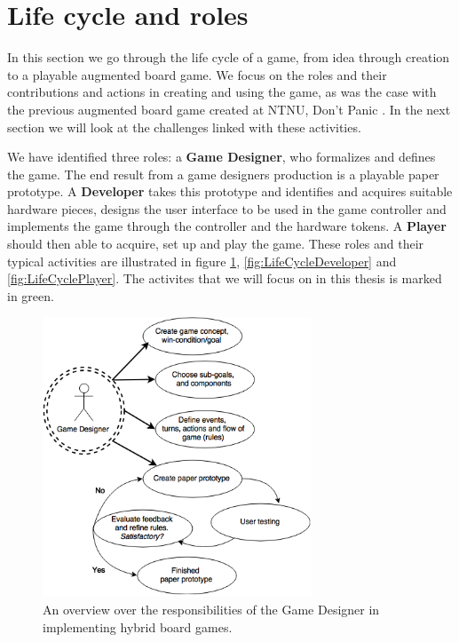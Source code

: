 \section{Life cycle and roles}
In this section we go through the life cycle of a game, from idea through creation to a playable augmented board game. We focus on the roles and their contributions and actions in creating and using the game, as was the case with the previous augmented board game created at NTNU, Don't Panic . In the next section we will look at the challenges linked with these activities. 

We have identified three roles: a \textbf{Game Designer}, who formalizes and defines the game. The end result from a game designers production is a playable paper prototype. A \textbf{Developer} takes this prototype and identifies and acquires suitable hardware pieces, designs the user interface to be used in the game controller and implements the game through the controller and the hardware tokens. A \textbf{Player} should then able to acquire, set up and play the game. These roles and their typical activities are illustrated in figure \ref{fig:LifeCycleGameDesigner}, \ref{fig:LifeCycleDeveloper} and \ref{fig:LifeCyclePlayer}. The activites that we will focus on in this thesis is marked in green.



\begin{figure}[ht]
\includegraphics[width=8cm]{img/LifeCycleGameDesigner}
\centering
\caption{An overview over the responsibilities of the Game Designer in implementing hybrid board games. }
\label{fig:LifeCycleGameDesigner}
\end{figure}

